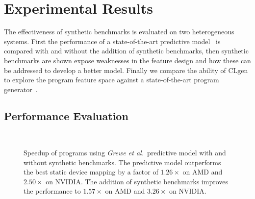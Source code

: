 \section{Experimental Results}
\label{sec:clgen-eval-results}

The effectiveness of synthetic benchmarks is evaluated on two heterogeneous systems. First the performance of a state-of-the-art predictive model~\cite{Grewe2013} is compared with and without the addition of synthetic benchmarks, then synthetic benchmarks are shown expose weaknesses in the feature design and how these can be addressed to develop a better model. Finally we compare the ability of CLgen to explore the program feature space against a state-of-the-art program generator~\cite{Lidbury2015a}.

\subsection{Performance Evaluation}

\begin{figure}
  \centering %
  \\%
  \caption[Speedup of programs with and without synthetic benchmarks]{%
    Speedup of programs using \emph{Grewe et al.\ }predictive model with and without synthetic benchmarks. The predictive model outperforms the best static device mapping by a factor of $1.26\times$ on AMD and $2.50\times$ on NVIDIA. The addition of synthetic benchmarks improves the performance to $1.57\times$ on AMD and $3.26\times$ on NVIDIA.%
  }%
  \label{fig:npb} %
\end{figure}

